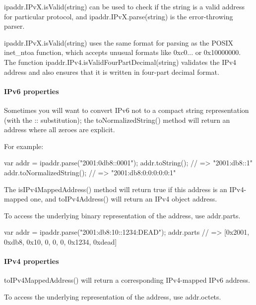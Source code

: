 {\ttfamily ipaddr.\+I\+Pv\+X.\+is\+Valid(string)} can be used to check if the string is a valid address for particular protocol, and {\ttfamily ipaddr.\+I\+Pv\+X.\+parse(string)} is the error-\/throwing parser.

{\ttfamily ipaddr.\+I\+Pv\+X.\+is\+Valid(string)} uses the same format for parsing as the P\+O\+S\+IX {\ttfamily inet\+\_\+ntoa} function, which accepts unusual formats like {\ttfamily 0xc0...} or {\ttfamily 0x10000000}. The function {\ttfamily ipaddr.\+I\+Pv4.\+is\+Valid\+Four\+Part\+Decimal(string)} validates the I\+Pv4 address and also ensures that it is written in four-\/part decimal format.

\paragraph*{I\+Pv6 properties}

Sometimes you will want to convert I\+Pv6 not to a compact string representation (with the {\ttfamily \+:\+:} substitution); the {\ttfamily to\+Normalized\+String()} method will return an address where all zeroes are explicit.

For example\+:


\begin{DoxyCode}
var addr = ipaddr.parse("2001:0db8::0001");
addr.toString(); // => "2001:db8::1"
addr.toNormalizedString(); // => "2001:db8:0:0:0:0:0:1"
\end{DoxyCode}


The {\ttfamily is\+I\+Pv4\+Mapped\+Address()} method will return {\ttfamily true} if this address is an I\+Pv4-\/mapped one, and {\ttfamily to\+I\+Pv4\+Address()} will return an I\+Pv4 object address.

To access the underlying binary representation of the address, use {\ttfamily addr.\+parts}.


\begin{DoxyCode}
var addr = ipaddr.parse("2001:db8:10::1234:DEAD");
addr.parts // => [0x2001, 0xdb8, 0x10, 0, 0, 0, 0x1234, 0xdead]
\end{DoxyCode}


\paragraph*{I\+Pv4 properties}

{\ttfamily to\+I\+Pv4\+Mapped\+Address()} will return a corresponding I\+Pv4-\/mapped I\+Pv6 address.

To access the underlying representation of the address, use {\ttfamily addr.\+octets}.



